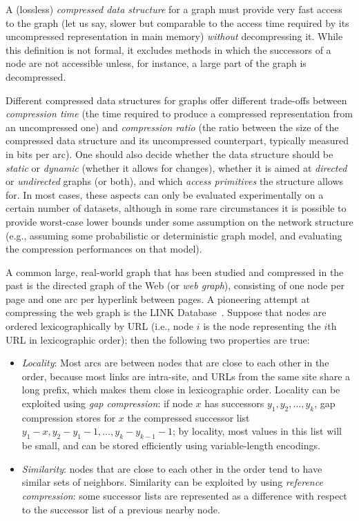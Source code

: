 A (lossless) \emph{compressed data structure} for a graph must provide very
fast access to the graph (let us say, slower but comparable to the access time
required by its uncompressed representation in main memory) \emph{without}
decompressing it.  While this definition is not formal, it excludes methods in
which the successors of a node are not accessible unless, for instance, a large
part of the graph is decompressed.

Different compressed data structures for graphs offer different trade-offs
between \emph{compression time} (the time required to produce a compressed
representation from an uncompressed one) and \emph{compression ratio} (the
ratio between the size of the compressed data structure and its uncompressed
counterpart, typically measured in bits per arc). One should also decide
whether the data structure should be \emph{static} or \emph{dynamic} (whether
it allows for changes), whether it is aimed at \emph{directed} or
\emph{undirected} graphs (or both), and which \emph{access primitives} the
structure allows for.  In most cases, these aspects can only be evaluated
experimentally on a certain number of datasets, although in some rare
circumstances it is possible to provide worst-case lower bounds under some
assumption on the network structure (e.g., assuming some probabilistic or
deterministic graph model, and evaluating the compression performances on that
model).

A common large, real-world graph that has been studied and compressed in the
past is the directed graph of the Web (or \emph{web graph}), consisting of one
node per page and one arc per hyperlink between pages.  A pioneering attempt at
compressing the web graph is the LINK Database~\cite{RSWLD}. Suppose that nodes
are ordered lexicographically by URL (i.e., node $i$ is the node representing
the $i$th URL in lexicographic order); then the following two properties are
true: \begin{itemize}

\item \emph{Locality}: Most arcs are between nodes that are close to each other
  in the order, because most links are intra-site, and URLs from the same site
  share a long prefix, which makes them close in lexicographic order.  Locality
  can be exploited using \emph{gap compression}: if node $x$ has successors
  $y_1, y_2, \dots, y_k$, gap compression stores for $x$ the compressed
  successor list $y_1-x,y_2-y_1-1,\dots,y_k-y_{k-1}-1$; by locality, most
  values in this list will be small, and can be stored efficiently using
  variable-length encodings.

\item \emph{Similarity}: nodes that are close to each other in the order tend
  to have similar sets of neighbors. Similarity can be exploited by using
  \emph{reference compression}: some successor lists are represented as a
  difference with respect to the successor list of a previous nearby node.

\end{itemize}


